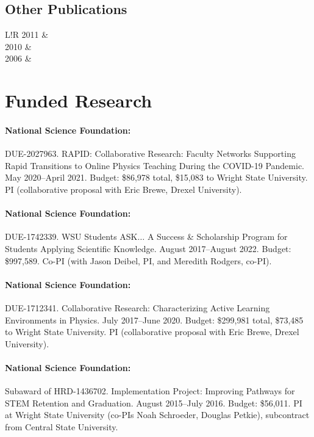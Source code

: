 \documentclass[10pt]{article}
\newcommand\VRule{\color{lightgray}\vrule width 0.5pt}
\begin{document}
\subsection*{Other Publications}
\begin{tabular}{L!{\VRule}R}
2011	& \\[5pt]
2010 	& \\[5pt]
2006 	& \\%
\end{tabular}
 
\section*{Funded Research}

\paragraph{National Science Foundation:} DUE-2027963. RAPID: Collaborative Research: Faculty Networks Supporting Rapid Transitions to Online Physics Teaching During the COVID-19 Pandemic. May 2020--April 2021. Budget: \$86,978 total, \$15,083 to Wright State University. PI (collaborative proposal with Eric Brewe, Drexel University).

\paragraph{National Science Foundation:} DUE-1742339. WSU Students ASK$\ldots$ A Success \& Scholarship Program for Students Applying Scientific Knowledge. August 2017--August 2022. Budget: \$997,589. Co-PI (with Jason Deibel, PI, and Meredith Rodgers, co-PI).

\paragraph{National Science Foundation:} DUE-1712341. Collaborative Research: Characterizing Active Learning Environments in Physics. July 2017--June 2020. Budget: \$299,981 total, \$73,485 to Wright State University. PI (collaborative proposal with Eric Brewe, Drexel University).

\paragraph{National Science Foundation:} Subaward of HRD-1436702. Implementation Project: Improving Pathways for STEM Retention and Graduation. August 2015--July 2016. Budget: \$56,011. PI at Wright State University (co-PIs Noah Schroeder, Douglas Petkie), subcontract from Central State University.
\end{document}
